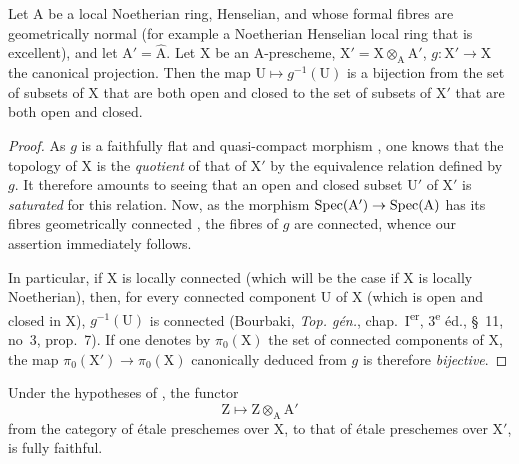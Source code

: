 \begin{corollary}[18.9.4]
\label{IV.18.9.4}
Let $\mathrm{A}$ be a local Noetherian ring, Henselian, and whose formal fibres are geometrically normal (for example a Noetherian Henselian local ring that is excellent), and let $\mathrm{A}'=\hat{\mathrm{A}}$.
Let $\mathrm{X}$ be an A-prescheme, $\mathrm{X}'=\mathrm{X}\otimes_{\mathrm{A}}\mathrm{A}'$, $g:\mathrm{X}'\to\mathrm{X}$ the canonical projection.
Then the map $\mathrm{U}\mapsto g^{-1}(\mathrm{U})$ is a bijection from the set of subsets of $\mathrm{X}$ that are both open and closed to the set of subsets of $\mathrm{X}'$ that are both open and closed.
\end{corollary}

\begin{proof}
As $g$ is a faithfully flat and quasi-compact morphism , one knows that the topology of X is the \emph{quotient} of that of $\mathrm{X}'$ by the equivalence relation defined by $g$.
It therefore amounts to seeing that an open and closed subset $\mathrm{U}'$ of $\mathrm{X}'$ is \emph{saturated} for this relation.
Now, as the morphism $\operatorname{Spec}(\mathrm{A}')\to\operatorname{Spec}(\mathrm{A})$ has its fibres geometrically connected , the fibres of $g$ are connected, whence our assertion immediately follows.

In particular, if X is locally connected (which will be the case if X is locally Noetherian), then, for every connected component U of X (which is open and closed
in X), $g^{-1}(\mathrm{U})$ is connected (Bourbaki, \emph{Top. g\'{e}n.}, chap.~I\textsuperscript{er}, 3\textsuperscript{e} \'{e}d., \S~11, no~3, prop.~7).
If one denotes by $\pi_0(\mathrm{X})$ the set of connected components of X, the map $\pi_0(\mathrm{X}')\to\pi_0(\mathrm{X})$ canonically deduced from $g$ is therefore \emph{bijective}.
\end{proof}

\begin{corollary}[18.9.5]
\label{IV.18.9.5}
Under the hypotheses of , the functor
\begin{equation}
  \mathrm{Z}\mapsto\mathrm{Z}\otimes_{\mathrm{A}}\mathrm{A}'
  \tag{18.9.5.1}
\label{IV.18.9.5.1}
\end{equation}
from the category of \'{e}tale preschemes over $\mathrm{X}$, to that of \'{e}tale preschemes over $\mathrm{X}'$, is fully faithful.
\end{corollary}


